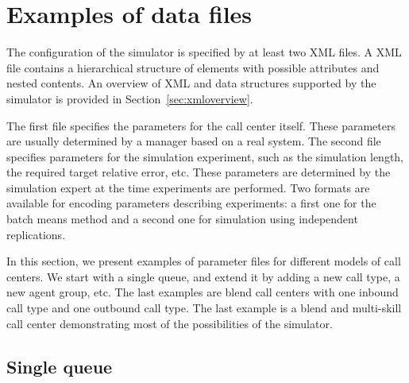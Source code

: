 \section{Examples of data files}
\label{sec:mskconfig}

The configuration of the simulator is specified by at least two XML files.
A XML \cite{iYER04a} file contains a hierarchical structure of elements with
possible attributes and nested contents.
An overview of XML and data structures supported by the simulator
is provided in Section~\ref{sec:xmloverview}.

The first file specifies the parameters for the call center
itself.  These parameters are usually determined by a manager based on a
real system.  The second file specifies parameters for the simulation
experiment, such
as the simulation length, the required target relative error, etc. These
parameters are determined by the simulation expert at the time
experiments are performed.
Two formats are available for encoding parameters describing
experiments: a first one for the batch means
method and a second one for simulation using independent
replications.

In this section, we present examples of parameter files for
different models of call centers.  We start with a single queue, and
extend it by adding a new call type, a new agent group, etc.
The last examples are blend call centers
with one inbound call type and one outbound call type.  The last
example is a blend and multi-skill call center demonstrating most of
the possibilities of the simulator.

\subsection{Single queue}
\label{sec:singlequeue}

